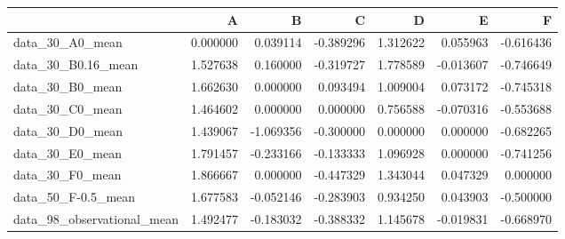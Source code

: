 \begin{tabular}{lrrrrrr}
\toprule
{} &         A &         B &         C &         D &         E &         F \\
\midrule
data\_30\_A0\_mean            &  0.000000 &  0.039114 & -0.389296 &  1.312622 &  0.055963 & -0.616436 \\
data\_30\_B0.16\_mean         &  1.527638 &  0.160000 & -0.319727 &  1.778589 & -0.013607 & -0.746649 \\
data\_30\_B0\_mean            &  1.662630 &  0.000000 &  0.093494 &  1.009004 &  0.073172 & -0.745318 \\
data\_30\_C0\_mean            &  1.464602 &  0.000000 &  0.000000 &  0.756588 & -0.070316 & -0.553688 \\
data\_30\_D0\_mean            &  1.439067 & -1.069356 & -0.300000 &  0.000000 &  0.000000 & -0.682265 \\
data\_30\_E0\_mean            &  1.791457 & -0.233166 & -0.133333 &  1.096928 &  0.000000 & -0.741256 \\
data\_30\_F0\_mean            &  1.866667 &  0.000000 & -0.447329 &  1.343044 &  0.047329 &  0.000000 \\
data\_50\_F-0.5\_mean         &  1.677583 & -0.052146 & -0.283903 &  0.934250 &  0.043903 & -0.500000 \\
data\_98\_observational\_mean &  1.492477 & -0.183032 & -0.388332 &  1.145678 & -0.019831 & -0.668970 \\
\bottomrule
\end{tabular}
